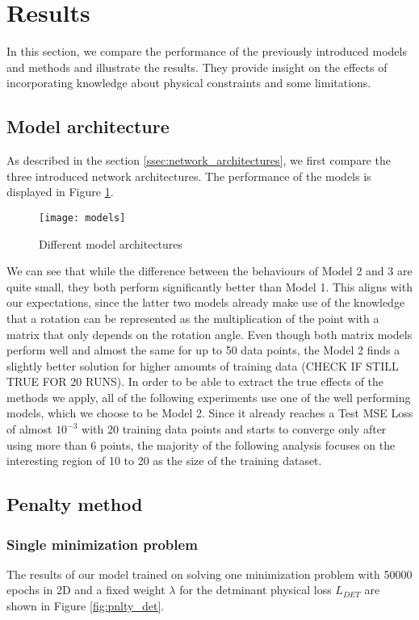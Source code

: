 \label{section:results}
\section{Results}

In this section, we compare the performance of the previously introduced models and methods and illustrate the results. They provide insight on the effects of incorporating knowledge about physical constraints and some limitations.

\subsection{Model architecture}
As described in the section \ref{ssec:network_architectures}, we first compare the three introduced network architectures. The performance of the models is displayed in Figure \ref{fig:models}.
\begin{figure}[ht]
	\texttt{[image: models]}
	\caption{Different model architectures}
	\label{fig:models}
\end{figure}
We can see that while the difference between the behaviours of Model 2 and 3 are quite small, they both perform significantly better than Model 1. This aligns with our expectations, since the latter two models already make use of the knowledge that a rotation can be represented as the multiplication of the point with a matrix that only depends on the rotation angle. Even though both matrix models perform well and almost the same for up to 50 data points, the Model 2 finds a slightly better solution for higher amounts of training data (CHECK IF STILL TRUE FOR 20 RUNS). In order to be able to extract the true effects of the methods we apply, all of the following experiments use one of the well performing models, which we choose to be Model 2. Since it already reaches a Test MSE Loss of almost $10^{-3}$ with 20 training data points and starts to converge only after using more than 6 points, the majority of the following analysis focuses on the interesting region of 10 to 20 as the size of the training dataset. 

\subsection{Penalty method}
\subsubsection{Single minimization problem}
The results of our model trained on solving one minimization problem with 50000 epochs in 2D and a fixed weight $\lambda$ for the detminant physical loss $L_{DET}$ are shown in Figure \ref{fig:pnlty_det}.

